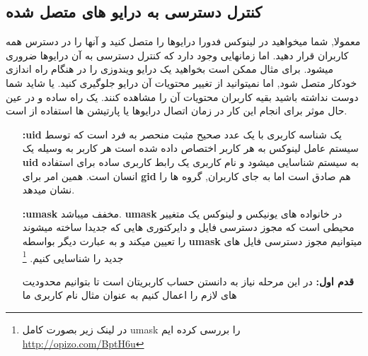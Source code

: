\subsection{کنترل دسترسی به درایو های متصل شده}\label{se-463}
معمولا, شما میخواهید در لینوکس فدورا درایوها را متصل کنید و آنها را در دسترس همه کاربران قرار دهید. اما زمانهایی وجود دارد که کنترل دسترسی به آن درایوها ضروری میشود. برای مثال ممکن است بخواهید یک درایو ویندوزی را در هنگام راه اندازی خودکار متصل شود, اما نمیتوانید از تغییر محتویات آن درایو جلوگیری کنید. یا شاید شما دوست نداشته باشید بقیه کاربران محتویات آن را مشاهده کنند. یک راه ساده و در عین حال موثر برای انجام این کار در زمان اتصال درایوها یا پارتیشن ها استفاده از
\textbf{}
است.
\begin{itemize}
	\item [\textbf{:uid}]
	یک شناسه کاربری با یک عدد صحیح مثبت منحصر به فرد است که توسط سیستم عامل لینوکس به هر کاربر اختصاص داده شده است هر کاربر به وسیله یک
	\textbf{uid}
	به سیستم شناسایی میشود و نام کاربری یک رابط کاربری ساده برای استفاده انسان است. همین امر برای
	\textbf{gid}
	هم صادق است اما به جای کاربران, گروه ها را نشان میدهد.
	\item[\textbf{:umask}] 
	مخفف 
	\textbf{}
	 میباشد. 
	 \textbf{umask}
	  در خانواده های یونیکس و لینوکس یک متغییر محیطی است که مجوز دسترسی فایل و دایرکتوری هایی که جدیدا ساخته میشوند را تعیین میکند و به عبارت دیگر بواسطه 
	  	 \textbf{umask}
	   میتوانیم مجوز دسترسی فایل های جدید را شناسایی کنیم. 
	   \footnote{در لینک زیر بصورت کامل umask را بررسی کرده ایم
	\href{http://www.linuxfedora.ir/umask-t186.html}{http://opizo.com/BptH6u}   
   }
\end{itemize}
\begin{enumerate}
	\item[\textbf{قدم اول:}]
	در این مرحله نیاز به دانستن
	\textbf{}
	حساب کاربریتان است تا بتوانیم محدودیت های لازم را اعمال کنیم به عنوان مثال نام کاربری ما

	
\end{enumerate}
